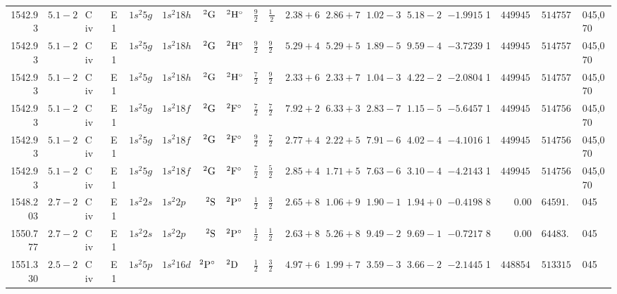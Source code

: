 \begin{table*}
\begin{tabular}{rrlcr@{ -- }lr@{ -- }lr@{ -- }lllllrrr@{ -- }rl}
   1542.93\phantom{00000000} & $5.1-2$ & C\,{\sc iv} & E1 &  $1s^{2}5g$ & $1s^{2}18h$ &       $^{2}{\rm G}$ & $^{2}{\rm H}^\circ$ &  $\frac{9}{2}$ & $\frac{11}{2}$ & $2.38+6$ & $2.86+7$ & $1.02-3$ & $5.18-2$ & $ -1.9915$ &     1 & $449945.20$ & $514757.00$ & 045,070 \\
   1542.93\phantom{00000000} & $5.1-2$ & C\,{\sc iv} & E1 &  $1s^{2}5g$ & $1s^{2}18h$ &       $^{2}{\rm G}$ & $^{2}{\rm H}^\circ$ &  $\frac{9}{2}$ & $\frac{9}{2}$  & $5.29+4$ & $5.29+5$ & $1.89-5$ & $9.59-4$ & $ -3.7239$ &     1 & $449945.20$ & $514757.00$ & 045,070 \\
   1542.93\phantom{00000000} & $5.1-2$ & C\,{\sc iv} & E1 &  $1s^{2}5g$ & $1s^{2}18h$ &       $^{2}{\rm G}$ & $^{2}{\rm H}^\circ$ &  $\frac{7}{2}$ & $\frac{9}{2}$  & $2.33+6$ & $2.33+7$ & $1.04-3$ & $4.22-2$ & $ -2.0804$ &     1 & $449945.20$ & $514757.00$ & 045,070 \\
   1542.93\phantom{00000000} & $5.1-2$ & C\,{\sc iv} & E1 &  $1s^{2}5g$ & $1s^{2}18f$ &       $^{2}{\rm G}$ & $^{2}{\rm F}^\circ$ &  $\frac{7}{2}$ & $\frac{7}{2}$  & $7.92+2$ & $6.33+3$ & $2.83-7$ & $1.15-5$ & $ -5.6457$ &     1 & $449945.20$ & $514756.80$ & 045,070 \\
   1542.93\phantom{00000000} & $5.1-2$ & C\,{\sc iv} & E1 &  $1s^{2}5g$ & $1s^{2}18f$ &       $^{2}{\rm G}$ & $^{2}{\rm F}^\circ$ &  $\frac{9}{2}$ & $\frac{7}{2}$  & $2.77+4$ & $2.22+5$ & $7.91-6$ & $4.02-4$ & $ -4.1016$ &     1 & $449945.20$ & $514756.80$ & 045,070 \\
   1542.93\phantom{00000000} & $5.1-2$ & C\,{\sc iv} & E1 &  $1s^{2}5g$ & $1s^{2}18f$ &       $^{2}{\rm G}$ & $^{2}{\rm F}^\circ$ &  $\frac{7}{2}$ & $\frac{5}{2}$  & $2.85+4$ & $1.71+5$ & $7.63-6$ & $3.10-4$ & $ -4.2143$ &     1 & $449945.20$ & $514756.80$ & 045,070 \\
   1548.203\phantom{0000000} & $2.7-2$ & C\,{\sc iv} & E1 &  $1s^{2}2s$ & $1s^{2}2p$  &       $^{2}{\rm S}$ & $^{2}{\rm P}^\circ$ &  $\frac{1}{2}$ & $\frac{3}{2}$  & $2.65+8$ & $1.06+9$ & $1.90-1$ & $1.94+0$ & $ -0.4198$ &     8 &      $0.00$ &  $64591.00$ & 045 \\
   1550.777\phantom{0000000} & $2.7-2$ & C\,{\sc iv} & E1 &  $1s^{2}2s$ & $1s^{2}2p$  &       $^{2}{\rm S}$ & $^{2}{\rm P}^\circ$ &  $\frac{1}{2}$ & $\frac{1}{2}$  & $2.63+8$ & $5.26+8$ & $9.49-2$ & $9.69-1$ & $ -0.7217$ &     8 &      $0.00$ &  $64483.80$ & 045 \\
   1551.330\phantom{0000000} & $2.5-2$ & C\,{\sc iv} & E1 &  $1s^{2}5p$ & $1s^{2}16d$ & $^{2}{\rm P}^\circ$ & $^{2}{\rm D}$       &  $\frac{1}{2}$ & $\frac{3}{2}$  & $4.97+6$ & $1.99+7$ & $3.59-3$ & $3.66-2$ & $ -2.1445$ &     1 & $448854.20$ & $513315.00$ & 045 \\

\end{tabular}
\end{table*}
